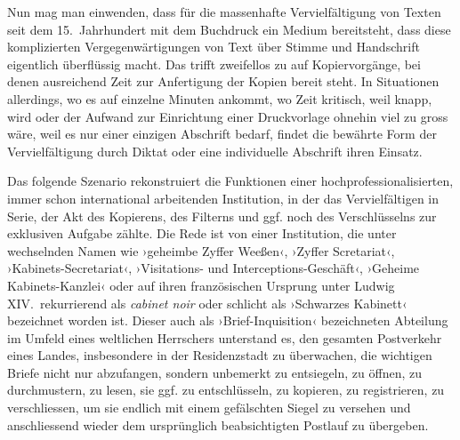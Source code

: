 \documentclass[a4paper,11pt]{article}
\newcommand{\inanf}[1]{›#1‹}
\begin{document}
Nun mag man einwenden, dass für die massenhafte Vervielfältigung von Texten seit dem 15.~Jahrhundert mit dem Buchdruck ein Medium bereitsteht, dass diese komplizierten Vergegenwärtigungen von Text über Stimme und Handschrift eigentlich überflüssig macht. Das trifft zweifellos zu auf Kopiervorgänge, bei denen ausreichend Zeit zur Anfertigung der Kopien bereit steht. In Situationen allerdings, wo es auf einzelne Minuten ankommt, wo Zeit kritisch, weil knapp, wird oder der Aufwand zur Einrichtung einer Druckvorlage ohnehin viel zu gross wäre, weil es nur einer einzigen Abschrift bedarf, findet die bewährte Form der Vervielfältigung durch Diktat oder eine individuelle Abschrift ihren Einsatz.

Das folgende Szenario rekonstruiert die Funktionen einer hochprofessionalisierten, immer schon international arbeitenden Institution, in der das Vervielfältigen in Serie, der Akt des Kopierens, des Filterns und ggf. noch des Verschlüsselns zur exklusiven Aufgabe zählte. Die Rede ist von einer Institution, die unter wechselnden Namen wie \inanf{geheimbe Zyffer Weeßen}, \inanf{Zyffer Scretariat}, \inanf{Kabinets-Secretariat}, \inanf{Visitations- und Interceptions-Geschäft}, \inanf{Geheime Kabinets-Kanzlei} oder auf ihren französischen Ursprung unter Ludwig XIV.\ rekurrierend als \emph{cabinet noir} oder schlicht als \inanf{Schwarzes Kabinett} bezeichnet worden ist. Dieser auch als \inanf{Brief-Inquisition} bezeichneten Abteilung im Umfeld eines weltlichen Herrschers unterstand es, den gesamten Postverkehr eines Landes, insbesondere in der Residenzstadt zu überwachen, die wichtigen Briefe nicht nur abzufangen, sondern unbemerkt zu entsiegeln, zu öffnen, zu durchmustern, zu lesen, sie ggf. zu entschlüsseln, zu kopieren, zu registrieren, zu verschliessen, um sie endlich mit einem gefälschten Siegel zu versehen und anschliessend wieder dem ursprünglich beabsichtigten Postlauf zu übergeben. 

\enlargethispage{5mm}
\end{document}
